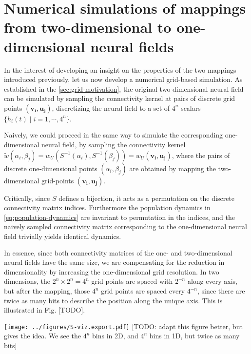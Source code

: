 \documentclass[10pt,letterpaper]{article}
\renewcommand{\vec}[1]{\boldsymbol{#1}}
\begin{document}
\section{Numerical simulations of mappings from two-dimensional to one-dimensional neural fields}

In the interest of developing an insight on the properties of the two mappings introduced previously, let us now develop a numerical grid-based simulation.
As established in the \autoref{sec:grid-motivation}, the original two-dimensional neural field can be simulated by sampling the connectivity kernel at pairs of discrete grid points $(\vec{v_i},\vec{u_j})$, discretizing the neural field to a set of $4^n$ scalars $\{h_i(t) \;|\; i=1,\cdots,4^n\}$.

Naively, we could proceed in the same way to simulate the corresponding one-dimensional neural field, by sampling the connectivity kernel $\tilde w(\alpha_i, \beta_j) = w_U(S^{-1}(\alpha_i), S^{-1}(\beta_j)) = w_U(\vec{v_i}, \vec{u_j})$, where the pairs of discrete one-dimensional points $(\alpha_i,\beta_j)$ are obtained by mapping the two-dimensional grid-points $(\vec{v_i},\vec{u_j})$.

Critically, since $S$ defines a bijection, it acts as a permutation on the discrete connectivity matrix indices. Furthermore the population dynamics in \autoref{eq:population-dynamics} are invariant to permutation in the indices, and the naively sampled connectivity matrix corresponding to the one-dimensional neural field trivially yields identical dynamics.

In essence, since both connectivity matrices of the one- and two-dimensional neural fields have the same size, we are compensating for the reduction in dimensionality by increasing the one-dimensional grid resolution. In two dimensions, the $2^n \times 2^n = 4^n$ grid points are spaced with $2^{-n}$ along every axis, but after the mapping, those $4^n$ grid points are spaced every $4^{-n}$, since there are twice as many bits to describe the position along the unique axis. This is illustrated in Fig. [TODO].

\texttt{[image: ../figures/S-viz.export.pdf]}
[TODO: adapt this figure better, but gives the idea. We see the $4^n$ bins in 2D, and $4^n$ bins in 1D, but twice as many bits]
\endif

\end{document}
